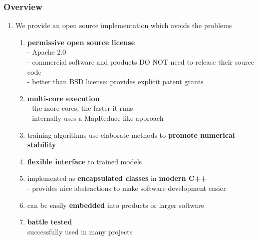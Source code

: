 \documentclass[usenames,dvipsnames]{beamer}
\begin{document}
\begin{frame}
\frametitle{Overview}

\begin{enumerate}[{~~$\boldsymbol{\bullet}$}]

\item We provide an open source implementation which avoids the problems

\begin{enumerate}[{$\boldsymbol{\rightarrow}$}]
\renewcommand{\itemsep}{1ex}
\item 
{\bf permissive open source license}\\
- Apache 2.0\\
- commercial software and products DO NOT need to release their source code\\
- better than BSD license: provides explicit patent grants

\item
{\bf multi-core execution}\\
- the more cores, the faster it runs\\
- internally uses a MapReduce-like approach

\item
training algorithms use elaborate methods to {\bf promote numerical stability}

\item
{\bf flexible interface} to trained models

\item
implemented as {\bf encapsulated classes} in {\bf modern C++}\\
- provides nice abstractions to make software development easier

\item
can be easily {\bf embedded} into products or larger software\\

\item
{\bf battle tested}\\
successfully used in many projects

\end{enumerate}

\end{enumerate}
\end{frame}

%
%
%
\end{document}
